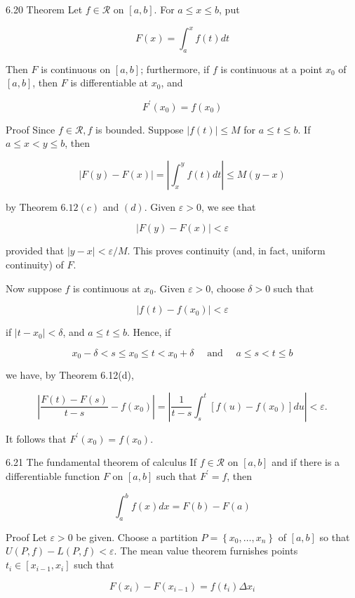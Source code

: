 \documentclass[10pt]{article}
\begin{document}
6.20 Theorem Let $f \in \mathscr{R}$ on $[a, b]$. For $a \leq x \leq b$, put

$$
F(x)=\int_{a}^{x} f(t) d t
$$

Then $F$ is continuous on $[a, b]$; furthermore, if $f$ is continuous at a point $x_{0}$ of $[a, b]$, then $F$ is differentiable at $x_{0}$, and

$$
F^{\prime}\left(x_{0}\right)=f\left(x_{0}\right)
$$

Proof Since $f \in \mathscr{R}, f$ is bounded. Suppose $|f(t)| \leq M$ for $a \leq t \leq b$. If $a \leq x<y \leq b$, then

$$
|F(y)-F(x)|=\left|\int_{x}^{y} f(t) d t\right| \leq M(y-x)
$$

by Theorem $6.12(c)$ and $(d)$. Given $\varepsilon>0$, we see that

$$
|F(y)-F(x)|<\varepsilon
$$

provided that $|y-x|<\varepsilon / M$. This proves continuity (and, in fact, uniform continuity) of $F$.

Now suppose $f$ is continuous at $x_{0}$. Given $\varepsilon>0$, choose $\delta>0$ such that

$$
\left|f(t)-f\left(x_{0}\right)\right|<\varepsilon
$$

if $\left|t-x_{0}\right|<\delta$, and $a \leq t \leq b$. Hence, if

$$
x_{0}-\delta<s \leq x_{0} \leq t<x_{0}+\delta \quad \text { and } \quad a \leq s<t \leq b
$$

we have, by Theorem 6.12(d),

$$
\left|\frac{F(t)-F(s)}{t-s}-f\left(x_{0}\right)\right|=\left|\frac{1}{t-s} \int_{s}^{t}\left[f(u)-f\left(x_{0}\right)\right] d u\right|<\varepsilon .
$$

It follows that $F^{\prime}\left(x_{0}\right)=f\left(x_{0}\right)$.

6.21 The fundamental theorem of calculus If $f \in \mathscr{R}$ on $[a, b]$ and if there is a differentiable function $F$ on $[a, b]$ such that $F^{\prime}=f$, then

$$
\int_{a}^{b} f(x) d x=F(b)-F(a)
$$

Proof Let $\varepsilon>0$ be given. Choose a partition $P=\left\{x_{0}, \ldots, x_{n}\right\}$ of $[a, b]$ so that $U(P, f)-L(P, f)<\varepsilon$. The mean value theorem furnishes points $t_{i} \in\left[x_{i-1}, x_{i}\right]$ such that

$$
F\left(x_{i}\right)-F\left(x_{i-1}\right)=f\left(t_{i}\right) \Delta x_{i}
$$
\end{document}
